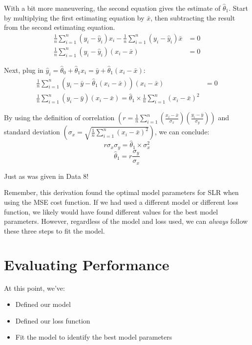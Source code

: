 \documentclass[
  letterpaper,
  DIV=11,
  numbers=noendperiod]{scrreprt}
\providecommand{\tightlist}{%
  \setlength{\itemsep}{0pt}\setlength{\parskip}{0pt}}\usepackage{longtable,booktabs,array}
\begin{document}
With a bit more maneuvering, the second equation gives the estimate of
\(\hat{\theta}_1\). Start by multiplying the first estimating equation
by \(\bar{x}\), then subtracting the result from the second estimating
equation. \[\begin{align}
\frac{1}{n} \sum_{i=1}^n (y_i - \hat{y}_i)x_i - \frac{1}{n} \sum_{i=1}^n (y_i - \hat{y}_i)\bar{x} &= 0 \\
\frac{1}{n} \sum_{i=1}^n (y_i - \hat{y}_i)(x_i - \bar{x}) &= 0
\end{align}\]

Next, plug in
\(\hat{y}_i = \hat{\theta}_0 + \hat{\theta}_1 x_i = \bar{y} + \hat{\theta}_1(x_i - \bar{x})\):
\[\begin{align}
\frac{1}{n} \sum_{i=1}^n (y_i - \bar{y} - \hat{\theta}_1(x_i - \bar{x}))(x_i - \bar{x}) &= 0 \\
\frac{1}{n} \sum_{i=1}^n (y_i - \bar{y})(x_i - \bar{x}) = \hat{\theta}_1 \times \frac{1}{n} \sum_{i=1}^n (x_i - \bar{x})^2
\end{align}\]

By using the definition of correlation
\(\left(r = \frac{1}{n} \sum_{i=1}^n (\frac{x_i-\bar{x}}{\sigma_x})(\frac{y_i-\bar{y}}{\sigma_y}) \right)\)
and standard deviation
\(\left(\sigma_x = \sqrt{\frac{1}{n} \sum_{i=1}^n (x_i - \bar{x})^2} \right)\),
we can conclude:
\[r \sigma_x \sigma_y = \hat{\theta}_1 \times \sigma_x^2\]
\[\hat{\theta}_1 = r \frac{\sigma_y}{\sigma_x}\]

Just as was given in Data 8!

Remember, this derivation found the optimal model parameters for SLR
when using the MSE cost function. If we had used a different model or
different loss function, we likely would have found different values for
the best model parameters. However, regardless of the model and loss
used, we can \emph{always} follow these three steps to fit the model.

\hypertarget{evaluating-performance}{%
\section{Evaluating Performance}\label{evaluating-performance}}

At this point, we've:

\begin{itemize}
\tightlist
\item
  Defined our model
\item
  Defined our loss function
\item
  Fit the model to identify the best model parameters
\end{itemize}
\end{document}
